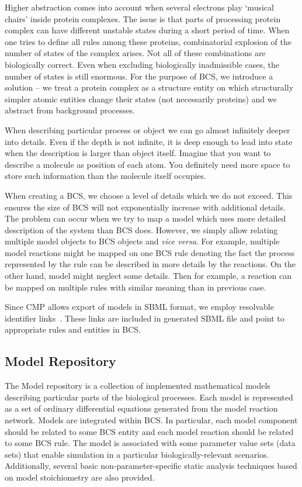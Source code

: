 \documentclass[12pt]{fithesis2}
\begin{document}
Higher abstraction comes into account when several electrons play `musical chairs' inside protein complexes. The issue is that parts of processing protein complex can have different unstable states during a short period of time. When one tries to define all rules among these proteins, combinatorial explosion of the number of states of the complex arises. Not all of these combinations are biologically correct. Even when excluding biologically inadmissible cases, the number of states is still enormous. For the purpose of BCS, we introduce a solution -- we treat a protein complex as a structure entity on which structurally simpler atomic entities change their states (not necessarily proteins) and we abstract from background processes.

When describing particular process or object we can go almost infinitely deeper into details. Even if the depth is not infinite, it is deep enough to lead into state when the description is larger than object itself. Imagine that you want to describe a molecule as position of each atom. You definitely need more space to store such information than the molecule itself occupies.

When creating a BCS, we choose a level of details which we do not exceed. This ensures the size of BCS will not exponentially increase with additional details. The problem can occur when we try to map a model which uses more detailed description of the system than BCS does. However, we simply allow relating multiple model objects to BCS objects and \emph{vice versa}. For example, multiple model reactions might be mapped on one BCS rule denoting the fact the process represented by the rule can be described in more details by the reactions. On the other hand, model might neglect some details. Then for example, a reaction can be mapped on multiple rules with similar meaning than in previous case.

Since CMP allows export of models in SBML format, we employ resolvable identifier links~\cite{juty2011identifiers}. These links are included in generated SBML file and point to appropriate rules and entities in BCS.

\subsection{Model Repository}
\label{model}

The Model repository is a collection of implemented mathematical models describing particular parts of the biological processes. Each model is represented as a set of ordinary differential equations generated from the model reaction network. Models are integrated within BCS. In particular, each model component should be related to some BCS entity and each model reaction should be related to some BCS rule. The model is associated with some parameter value sets (data sets) that enable simulation in a particular biologically-relevant scenarios. Additionally, several basic non-parameter-specific static analysis techniques based on model stoichiometry are also provided.
\end{document}
